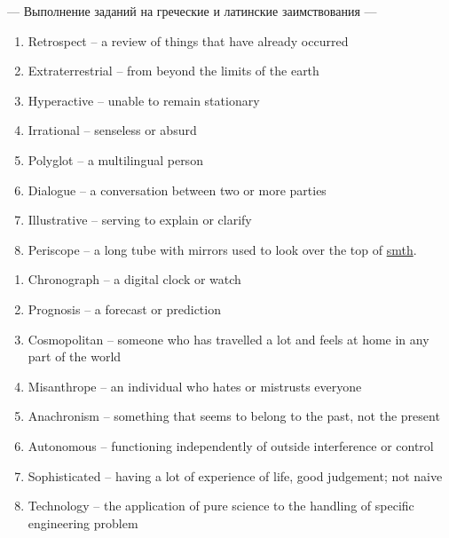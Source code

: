 \documentclass[main.tex]{subfiles}
\begin{document}


--- Выполнение заданий на греческие и латинские заимствования ---
\vspace{7pt}


\begin{enumerate}[nosep]
	\itemsep\eitsp
	\item Retrospect -- a review of things that have already occurred
	\item Extraterrestrial -- from beyond the limits of the earth
	\item Hyperactive -- unable to remain stationary
	\item Irrational -- senseless or absurd
	\item Polyglot -- a multilingual person
	\item Dialogue -- a conversation between two or more parties
	\item Illustrative -- serving to explain or clarify
	\item Periscope -- a long tube with mirrors used to look over the top of \underline{smth}.
\end{enumerate}
\vspace{5pt}


\begin{enumerate}[nosep]
	\itemsep\eitsp
	\item Chronograph -- a digital clock or watch
	\item Prognosis -- a forecast or prediction
	\item Cosmopolitan -- someone who has travelled a lot and feels at home in any part of the world
	\item Misanthrope -- an individual who hates or mistrusts everyone
	\item Anachronism -- something that seems to belong to the past, not the present
	\item Autonomous -- functioning independently of outside interference or control
	\item Sophisticated -- having a lot of experience of life, good judgement; not naive
	\item Technology -- the application of pure science to the handling of specific engineering problem
\end{enumerate}
\vspace{7pt}
\end{document}

